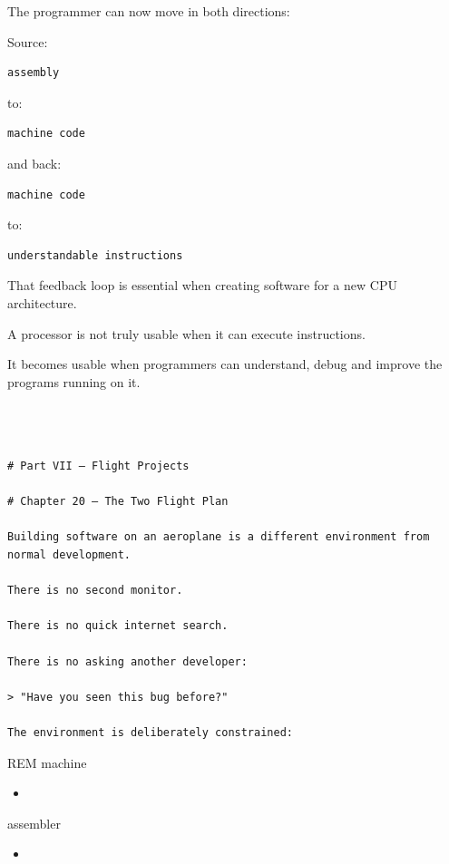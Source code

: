 \documentclass[
  oneside,
  openany]{book}
\providecommand{\tightlist}{%
  \setlength{\itemsep}{0pt}\setlength{\parskip}{0pt}}
\begin{document}
The programmer can now move in both directions:

Source:

\begin{verbatim}
assembly
\end{verbatim}

to:

\begin{verbatim}
machine code
\end{verbatim}

and back:

\begin{verbatim}
machine code
\end{verbatim}

to:

\begin{verbatim}
understandable instructions
\end{verbatim}

That feedback loop is essential when creating software for a new CPU
architecture.

A processor is not truly usable when it can execute instructions.

It becomes usable when programmers can understand, debug and improve the
programs running on it.

\begin{verbatim}



# Part VII — Flight Projects

# Chapter 20 — The Two Flight Plan

Building software on an aeroplane is a different environment from normal development.

There is no second monitor.

There is no quick internet search.

There is no asking another developer:

> "Have you seen this bug before?"

The environment is deliberately constrained:
\end{verbatim}

REM machine

\begin{itemize}
\tightlist
\item
\end{itemize}

assembler

\begin{itemize}
\tightlist
\item
\end{itemize}
\end{document}
